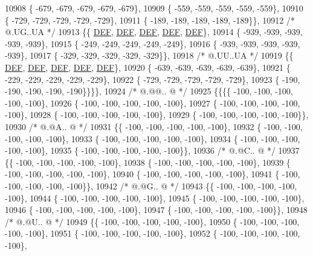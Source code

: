 \begin{DoxyCode}
10908 \{ -679, -679, -679, -679, -679\},
10909 \{ -559, -559, -559, -559, -559\},
10910 \{ -729, -729, -729, -729, -729\},
10911 \{ -189, -189, -189, -189, -189\}\},
10912 \textcolor{comment}{/*  @.UG..UA */}
10913 \{\{  \mbox{\hyperlink{1_88_84__epars_8h_a397419fc12b37ed479c8abb9d444d843}{DEF}},  \mbox{\hyperlink{1_88_84__epars_8h_a397419fc12b37ed479c8abb9d444d843}{DEF}},  \mbox{\hyperlink{1_88_84__epars_8h_a397419fc12b37ed479c8abb9d444d843}{DEF}},  \mbox{\hyperlink{1_88_84__epars_8h_a397419fc12b37ed479c8abb9d444d843}{DEF}},  \mbox{\hyperlink{1_88_84__epars_8h_a397419fc12b37ed479c8abb9d444d843}{DEF}}\},
10914 \{ -939, -939, -939, -939, -939\},
10915 \{ -249, -249, -249, -249, -249\},
10916 \{ -939, -939, -939, -939, -939\},
10917 \{ -329, -329, -329, -329, -329\}\},
10918 \textcolor{comment}{/*  @.UU..UA */}
10919 \{\{  \mbox{\hyperlink{1_88_84__epars_8h_a397419fc12b37ed479c8abb9d444d843}{DEF}},  \mbox{\hyperlink{1_88_84__epars_8h_a397419fc12b37ed479c8abb9d444d843}{DEF}},  \mbox{\hyperlink{1_88_84__epars_8h_a397419fc12b37ed479c8abb9d444d843}{DEF}},  \mbox{\hyperlink{1_88_84__epars_8h_a397419fc12b37ed479c8abb9d444d843}{DEF}},  \mbox{\hyperlink{1_88_84__epars_8h_a397419fc12b37ed479c8abb9d444d843}{DEF}}\},
10920 \{ -639, -639, -639, -639, -639\},
10921 \{ -229, -229, -229, -229, -229\},
10922 \{ -729, -729, -729, -729, -729\},
10923 \{ -190, -190, -190, -190, -190\}\}\}\},
10924 \textcolor{comment}{/*  @.@@.. @ */}
10925 \{\{\{\{ -100, -100, -100, -100, -100\},
10926 \{ -100, -100, -100, -100, -100\},
10927 \{ -100, -100, -100, -100, -100\},
10928 \{ -100, -100, -100, -100, -100\},
10929 \{ -100, -100, -100, -100, -100\}\},
10930 \textcolor{comment}{/*  @.@A.. @ */}
10931 \{\{ -100, -100, -100, -100, -100\},
10932 \{ -100, -100, -100, -100, -100\},
10933 \{ -100, -100, -100, -100, -100\},
10934 \{ -100, -100, -100, -100, -100\},
10935 \{ -100, -100, -100, -100, -100\}\},
10936 \textcolor{comment}{/*  @.@C.. @ */}
10937 \{\{ -100, -100, -100, -100, -100\},
10938 \{ -100, -100, -100, -100, -100\},
10939 \{ -100, -100, -100, -100, -100\},
10940 \{ -100, -100, -100, -100, -100\},
10941 \{ -100, -100, -100, -100, -100\}\},
10942 \textcolor{comment}{/*  @.@G.. @ */}
10943 \{\{ -100, -100, -100, -100, -100\},
10944 \{ -100, -100, -100, -100, -100\},
10945 \{ -100, -100, -100, -100, -100\},
10946 \{ -100, -100, -100, -100, -100\},
10947 \{ -100, -100, -100, -100, -100\}\},
10948 \textcolor{comment}{/*  @.@U.. @ */}
10949 \{\{ -100, -100, -100, -100, -100\},
10950 \{ -100, -100, -100, -100, -100\},
10951 \{ -100, -100, -100, -100, -100\},
10952 \{ -100, -100, -100, -100, -100\},

\end{DoxyCode}

